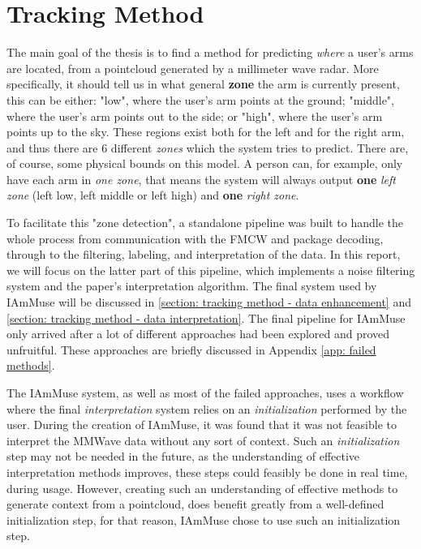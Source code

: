 \chapter{Tracking Method}
\label{chapter: tracking method}

The main goal of the thesis is to find a method for predicting \textit{where} a user's arms are located, from a pointcloud generated by a millimeter wave radar.
More specifically, it should tell us in what general \textbf{zone} the arm is currently present, this can be either: 
"low", where the user's arm points at the ground;
"middle", where the user's arm points out to the side;
or "high", where the user's arm points up to the sky.
These regions exist both for the left and for the right arm, and thus there are 6 different \textit{zones} which the system tries to predict.
There are, of course, some physical bounds on this model. 
A person can, for example, only have each arm in \textit{one zone}, that means the system will always output \textbf{one} \textit{left zone} (left low, left middle or left high) and \textbf{one} \textit{right zone}.

To facilitate this "zone detection", a standalone pipeline was built to handle the whole process from communication with the FMCW and package decoding, through to the filtering, labeling, and interpretation of the data. 
In this report, we will focus on the latter part of this pipeline, which implements a noise filtering system and the paper's interpretation algorithm.
The final system used by IAmMuse will be discussed in \cref{section: tracking method - data enhancement}
 and \cref{section: tracking method - data interpretation}.
The final pipeline for IAmMuse only arrived after a lot of different approaches had been explored and proved unfruitful.
These approaches are briefly discussed in Appendix \ref{app: failed methods}.


The IAmMuse system, as well as most of the failed approaches, uses a workflow where the final \textit{interpretation} system relies on an \textit{initialization} performed by the user.
During the creation of IAmMuse, it was found that it was not feasible to interpret the MMWave data without any sort of context.
Such an \textit{initialization} step may not be needed in the future, as the understanding of effective interpretation methods improves, these steps could feasibly be done in real time, during usage.
However, creating such an understanding of effective methods to generate context from a pointcloud, does benefit greatly from a well-defined initialization step, for that reason, IAmMuse chose to use such an initialization step.





